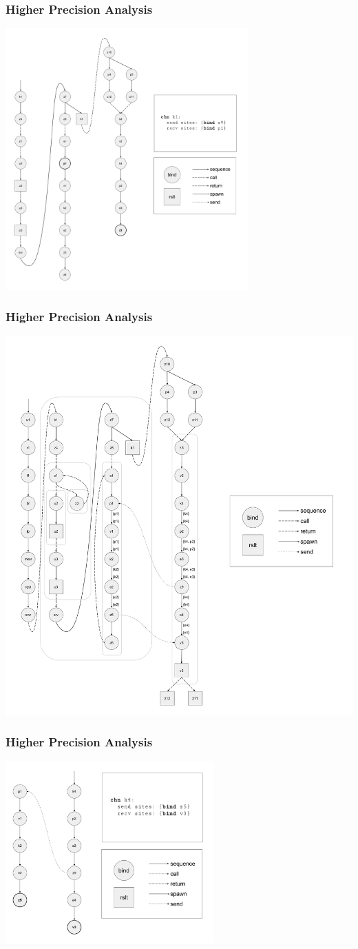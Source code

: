 \documentclass{beamer}
\begin{document}
\begin{frame}
\frametitle{Higher Precision Analysis}
\includegraphics[width=0.7\textwidth]{cml-graph-k1.pdf}
\end{frame}

\begin{frame}
\frametitle{Higher Precision Analysis}
\includegraphics[width=.72\textwidth]{cml-liveness-analysis-k4.pdf}
\end{frame}

\begin{frame}
\frametitle{Higher Precision Analysis}
\includegraphics[width=0.6\textwidth]{cml-graph-k4.pdf}
\end{frame}
\end{document}
